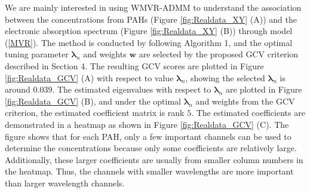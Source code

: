 \documentclass[alpha-refs]{wiley-article}
\begin{document}
We are mainly interested in using WMVR-ADMM to understand the association between the concentrations from PAHs (Figure
\ref{fig:Realdata_XY} (A)) and the electronic absorption spectrum  (Figure \ref{fig:Realdata_XY} (B)) through model (\ref{MVR}). The method is conducted by following Algorithm 1, and the optimal tuning parameter $\boldsymbol{\lambda}_{n}$ and weights $\boldsymbol{w}$ are selected by the proposed GCV criterion described in Section 4.
The resulting GCV scores are plotted in Figure \ref{fig:Realdata_GCV} (A) with respect to value $\boldsymbol{\lambda}_{n}$, showing the selected $\boldsymbol{\lambda}_{n}$ is around $0.039$.
The estimated eigenvalues with respect to $\boldsymbol{\lambda}_{n}$ are plotted in Figure \ref{fig:Realdata_GCV} (B), and under the optimal $\boldsymbol{\lambda}_{n}$ and weights from the GCV criterion, the estimated coefficient matrix is rank $5$.
The estimated coefficients are demonstrated in a heatmap as shown in Figure \ref{fig:Realdata_GCV} (C).
The figure shows that for each PAH, only a few important channels can be used to determine the concentrations because only some coefficients are relatively large.
Additionally, these larger coefficients are usually from smaller column numbers in the heatmap.
Thus, the channels with smaller wavelengths are more important than larger wavelength channels.
\end{document}
